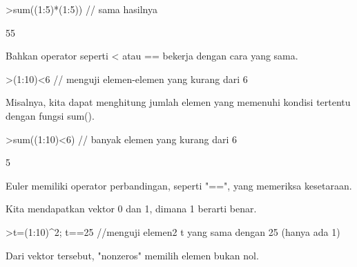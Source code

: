 \documentclass{article}
\begin{document}
\begin{eulernotebook}
\begin{eulercomment}
\begin{eulercomment}
\begin{eulercomment}
\begin{eulercomment}
\begin{eulerprompt}
>sum((1:5)*(1:5)) // sama hasilnya
\end{eulerprompt}
\begin{euleroutput}
  55
\end{euleroutput}
\begin{eulercomment}
Bahkan operator seperti \textless{} atau == bekerja dengan cara yang sama.
\end{eulercomment}
\begin{eulerprompt}
>(1:10)<6 // menguji elemen-elemen yang kurang dari 6
\end{eulerprompt}
\begin{euleroutput}
  [1,  1,  1,  1,  1,  0,  0,  0,  0,  0]
\end{euleroutput}
\begin{eulercomment}
Misalnya, kita dapat menghitung jumlah elemen yang memenuhi kondisi
tertentu dengan fungsi sum().
\end{eulercomment}
\begin{eulerprompt}
>sum((1:10)<6) // banyak elemen yang kurang dari 6
\end{eulerprompt}
\begin{euleroutput}
  5
\end{euleroutput}
\begin{eulercomment}
Euler memiliki operator perbandingan, seperti "==", yang memeriksa
kesetaraan.

Kita mendapatkan vektor 0 dan 1, dimana 1 berarti benar.
\end{eulercomment}
\begin{eulerprompt}
>t=(1:10)^2; t==25 //menguji elemen2 t yang sama dengan 25 (hanya ada 1)
\end{eulerprompt}
\begin{euleroutput}
  [0,  0,  0,  0,  1,  0,  0,  0,  0,  0]
\end{euleroutput}
\begin{eulercomment}
Dari vektor tersebut, "nonzeros" memilih elemen bukan nol.


\end{eulercomment}
\end{eulercomment}
\end{eulercomment}
\end{eulercomment}
\end{eulercomment}
\end{eulernotebook}
\end{document}
